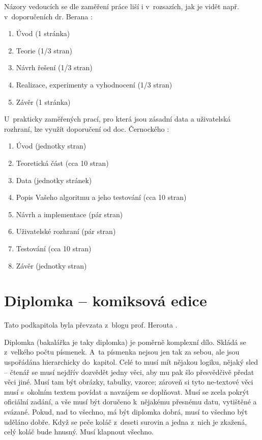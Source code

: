 Názory vedoucích se dle zaměření práce liší i v~rozsazích, jak je vidět např. v~doporučeních dr. Berana \cite{Beran}:
\begin{enumerate}
  \item{Úvod (1 stránka)}
  \item{Teorie (1/3 stran)}
  \item{Návrh řešení (1/3 stran)}
  \item{Realizace, experimenty a vyhodnocení (1/3 stran)}
  \item{Závěr (1 stránka)}
\end{enumerate}

U~prakticky zaměřených prací, pro která jsou zásadní data a uživatelská rozhraní, lze využít doporučení od doc. Černockého \cite{Cernocky}:
\begin{enumerate}
  \item{Úvod (jednotky stran)}
  \item{Teoretická část (cca 10 stran)}
  \item{Data (jednotky stránek)}
  \item{Popis Vašeho algoritmu a jeho testování (cca 10 stran)}
  \item{Návrh a implementace (pár stran)}
  \item{Uživatelské rozhraní (pár stran)}
  \item{Testování (cca 10 stran)}
  \item{Závěr (jednotky stran)}
\end{enumerate}

\section{Diplomka -- komiksová edice}
Tato podkapitola byla převzata z~blogu prof. Herouta \cite{Herout}.

Diplomka (bakalářka je taky diplomka) je poměrně komplexní dílo. Skládá se z~velkého počtu písmenek. A~ta písmenka nejsou jen tak za sebou, ale jsou uspořádána hierarchicky do~kapitol. Celé to musí mít nějakou logiku, nějaký sled -- čtenář se musí nejdřív dozvědět jedny věci, aby mu pak šlo přesvědčivě předat věci jiné. Musí tam být obrázky, tabulky, vzorce; zároveň si tyto ne-textové věci musí s~okolním textem povídat a navzájem se doplňovat. Musí se zcela pokrýt oficiální zadání, a vše musí být doručeno k~nějakému přesnému datu, vytištěné a svázané. Pokud, nad to všechno, má být diplomka dobrá, musí to všechno být uděláno dobře. Když se peče koláč z~deseti surovin a jedna z~nich je zkažená, celý koláč bude hnusný. Musí klapnout všechno.

